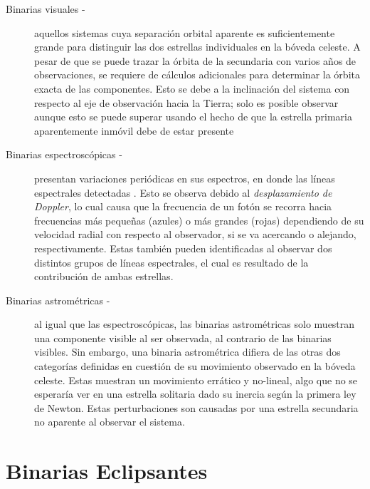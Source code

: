 \begin{description}
	\item[Binarias visuales -] aquellos sistemas cuya separación orbital
	aparente es suficientemente grande para distinguir las dos estrellas
	individuales en la bóveda celeste. A pesar de que se puede trazar la órbita
	de la secundaria con varios años de observaciones, se requiere de cálculos
	adicionales para determinar la órbita exacta de las componentes. Esto se
	debe a la inclinación del sistema con respecto al eje de observación hacia
	la Tierra; solo es posible observar  aunque esto se puede superar usando
	el hecho de que la estrella primaria aparentemente inmóvil debe de estar
	presente 

	\item[Binarias espectroscópicas -] presentan variaciones periódicas en sus
	espectros, en donde las líneas espectrales detectadas 
	. Esto se observa debido
	al \textit{desplazamiento de Doppler}, lo cual causa que la frecuencia de un
	fotón se recorra hacia frecuencias más pequeñas (azules) o más grandes
	(rojas) dependiendo de su velocidad radial con respecto al observador, si se
	va acercando o alejando, respectivamente. Estas también pueden identificadas
	al observar dos distintos grupos de líneas espectrales, el cual es resultado
	de la contribución de ambas estrellas.

	\item[Binarias astrométricas -] al igual que las espectroscópicas, las
	binarias astrométricas solo muestran una componente visible al ser
	observada, al contrario de las binarias visibles. Sin embargo, una binaria
	astrométrica difiera de las otras dos categorías definidas en cuestión de su
	movimiento observado en la bóveda celeste. Estas muestran un movimiento
	errático y no-lineal, algo que no se esperaría ver en una estrella solitaria
	dado su inercia según la primera ley de Newton. Estas perturbaciones son
	causadas por una estrella secundaria no aparente al observar el sistema. 
\end{description}

\section{Binarias Eclipsantes}


